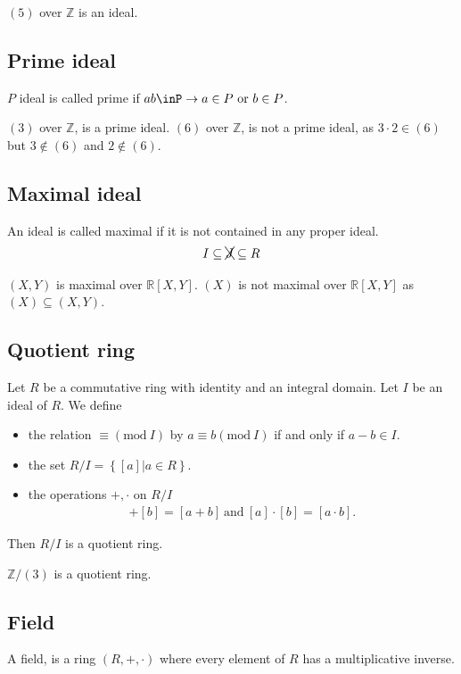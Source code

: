 \documentclass[10pt]{amsart}
\newcommand{\Z}{\mathbb{Z}}
\newcommand{\R}{\mathbb{R}}
\newcommand{\ra}{\rightarrow}
\renewcommand{\mod}[2]{#1\left(\text{mod}\ #2\right)}
\begin{document}
$(5)$ over $\Z$ is an ideal.

\subsection{Prime ideal}%
\label{sub:prime_ideal}

$P$ ideal is called prime if $ab\inP\ra a\in P\ \text{or}\ b\in P$.

$(3)$ over $\Z$, is a prime ideal. $(6)$ over $\Z$, is not a prime ideal, as
$3\cdot 2\in(6)$ but $3\notin(6)$ and $2\notin(6)$.

\subsection{Maximal ideal}%
\label{sub:maximal_ideal}

An ideal is called maximal if it is not contained in any proper ideal.
\begin{align}
  I\subseteq \xcancel{J}\subseteq R
\end{align}

$(X,Y)$ is maximal over $\R[X,Y]$.
$(X)$ is not maximal over $\R[X,Y]$ as $(X)\subseteq(X,Y)$.

\subsection{Quotient ring}%
\label{sub:quotient_ring}

Let $R$ be a commutative ring with identity and an integral domain. Let $I$ be
an ideal of $R$. We define
\begin{itemize}
  \item the relation $\mod{\equiv}{I}$ by $\mod{a\equiv b}{I}$ if and only if
    $a-b\in I$.
  \item the set $R/I=\left\{[a]\vert a\in R\right\}$.
  \item the operations $+,\cdot$ on $R/I$
    \begin{align*}
      [a]+[b]=[a+b]\ \text{and}\ [a]\cdot[b]=[a\cdot b].
    \end{align*}
\end{itemize}
Then $R/I$ is a quotient ring.

$\Z/(3)$ is a quotient ring.

\subsection{Field}%
\label{sub:field}

A field, is a ring $(R,+,\cdot)$ where every element of $R$ has a
multiplicative inverse.
\end{document}
